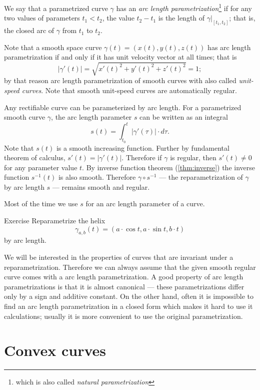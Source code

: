 We say that a parametrized curve $\gamma$ has an \emph{arc length parametrization}\footnote{which is also called \emph{natural parametrization}}
if for any two values of parameters $t_1<t_2$, the value $t_2-t_1$ is the length of $\gamma|_{[t_1,t_2]}$; that is, the closed arc of $\gamma$ from $t_1$ to $t_2$.

Note that a smooth space curve $\gamma(t)=(x(t),y(t),z(t))$ has arc length parametrization if and only if it has unit velocity vector at all times;
that is 
\[|\gamma'(t)|=\sqrt{x'(t)^2+y'(t)^2+z'(t)^2}=1;\]
by that reason arc length parametrization of smooth curves with also called \emph{unit-speed curves}.
Note that smooth unit-speed curves are automatically regular.


Any rectifiable curve can be parameterized by arc length.
For a parametrized smooth curve $\gamma$, the arc length parameter $s$ can be written as an integral
\[s(t)=\int_{t_0}^t |\gamma'(\tau)|\cdot d\tau.\]
Note that $s(t)$ is a smooth increasing function.
Further by fundamental theorem of calculus, $s'(t)=|\gamma'(t)|$.
Therefore if $\gamma$ is regular, then $s'(t)\ne0$ for any parameter value $t$.
By inverse function theorem (\ref{thm:inverse}) the inverse function $s^{-1}(t)$ is also smooth.
Therefore $\gamma\circ s^{-1}$ --- the reparametrization  of $\gamma$ by arc length  $s$ --- remains smooth and regular.

Most of the time we use $s$ for an arc length parameter of a curve.

\begin{thm}{Exercise}\label{ex:arc-length-helix}
Reparametrize the helix 
\[\gamma_{a,b}(t)=(a\cdot\cos t,a\cdot \sin t, b\cdot t)\]
by arc length.
\end{thm}

We will be interested in the properties of curves that are invariant under a reparametrization.
Therefore we can always assume that the given smooth regular curve comes with a arc length parametrization.
A good property of arc length parametrizations is that it is almost canonical --- these parametrizations differ only by a sign and additive constant.
On the other hand, often it is impossible to find an arc length parametrization in a closed form which makes it hard to use it calculations;
usually it is more convenient to use the original parametrization.

\section*{Convex curves}


